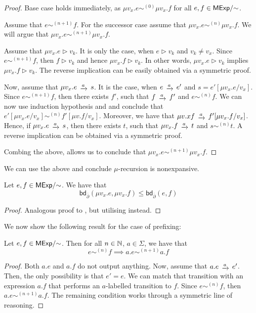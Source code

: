 \begin{proof}
	Base case holds immediately, as $\mu v_x.e \sim^{(0)} \mu v_x.f$ for all $e, f \in {\mathsf{MExp}}/{\sim}$. 
	
	Assume that $e \sim^{(n+1)} f$. For the successor case assume that $\mu v_x . e \sim^{(n)} \mu v_x. f$. We will argue that $\mu v_x . e \sim^{(n+1)} \mu v_x. f$.
	
	Assume that $\mu v_x.e \rhd v_k$. It is only the case, when $e \rhd {v_k}$ and $v_k \neq v_x$. Since $e \sim^{(n+1)} f$, then $f \rhd {v_k}$ and hence $\mu v_x . f \rhd v_k$. In other words, $\mu v_x.e \rhd v_k$ implies $\mu v_x. f \rhd v_k$. The reverse implication can be easily obtained via a symmetric proof.
	
	Now, assume that $\mu v_x.e \tr{a} s$. It is the case, when $e \tr{a} e'$ and $s = e'[\mu v_x.e / v_x]$. Since $e \sim^{(n+1)} f$, then there exists $f'$, such that $f \tr{a} f'$ and $e \sim^{(n)} f$. We can now use induction hypothesis and  and conclude that $e'[\mu v_x. e / v_x] \sim^{(n)} f' [\mu v. f / v_x]$. Moreover, we have that $\mu v.x f \tr{a} f'[\mu v_x.f/v_x]$. Hence, if $\mu v_x.e \tr{a} s$, then there exists $t$, such that $\mu v_x.f \tr{a} t$ and $s \sim^{(n)} t$. A reverse implication can be obtained via a symmetric proof. 
	
	Combing the above, allows us to conclude that $\mu v_x. e \sim^{(n+1)} \mu v_x . f$.
\end{proof}
We can use the above and conclude $\mu$-recursion is nonexpansive.
\begin{corollary}\label{cor:rec_nexp}
	Let $e,f \in {\mathsf{MExp}}/{\sim}$. We have that
	$$
		\mathsf{bd}_{\overline\partial} (\mu v_x.e,\mu v_x.f)\leq \mathsf{bd}_{\overline\partial} (e,f)
	$$
\end{corollary}
\begin{proof}
	Analogous proof to , but utilising  instead.
\end{proof}
We now show the following result for the case of prefixing:
\begin{lemma}\label{lem:prefixing_step}
	Let $e,f \in {\mathsf{MExp}}/{\sim}$. Then for all $n \in \mathbb{N}$, $a \in \Sigma$, we have that
	$$
	e \sim^{(n)} f \implies a.e \sim^{(n+1)} a.f 
	$$
\end{lemma}
\begin{proof}
	Both $a.e$ and $a.f$ do not output anything. Now, assume that $a.e \tr{a} e'$. Then, the only possibility is that $e'=e$. We can match that transition with an expression $a.f$ that performs an $a$-labelled transition to $f$. Since $e \sim^{(n)} f$, then $a.e \sim^{(n+1)} a.f$. The remaining condition works through a symmetric line of reasoning. 
\end{proof}
